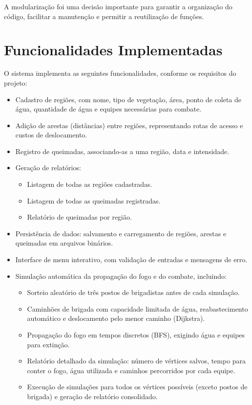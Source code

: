 \documentclass{article}
\begin{document}
A modularização foi uma decisão importante para garantir a organização do código, facilitar a manutenção e permitir a reutilização de funções.

\section{Funcionalidades Implementadas}

O sistema implementa as seguintes funcionalidades, conforme os requisitos do projeto:

\begin{itemize}
    \item Cadastro de regiões, com nome, tipo de vegetação, área, ponto de coleta de água, quantidade de água e equipes necessárias para combate.
    \item Adição de arestas (distâncias) entre regiões, representando rotas de acesso e custos de deslocamento.
    \item Registro de queimadas, associando-as a uma região, data e intensidade.
    \item Geração de relatórios:
        \begin{itemize}
            \item Listagem de todas as regiões cadastradas.
            \item Listagem de todas as queimadas registradas.
            \item Relatório de queimadas por região.
        \end{itemize}
    \item Persistência de dados: salvamento e carregamento de regiões, arestas e queimadas em arquivos binários.
    \item Interface de menu interativo, com validação de entradas e mensagens de erro.
    \item Simulação automática da propagação do fogo e do combate, incluindo:
        \begin{itemize}
            \item Sorteio aleatório de três postos de brigadistas antes de cada simulação.
            \item Caminhões de brigada com capacidade limitada de água, reabastecimento automático e deslocamento pelo menor caminho (Dijkstra).
            \item Propagação do fogo em tempos discretos (BFS), exigindo água e equipes para extinção.
            \item Relatório detalhado da simulação: número de vértices salvos, tempo para conter o fogo, água utilizada e caminhos percorridos por cada equipe.
            \item Execução de simulações para todos os vértices possíveis (exceto postos de brigada) e geração de relatório consolidado.
        \end{itemize}
\end{itemize}
\end{document}
